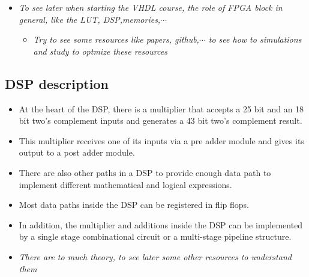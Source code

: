  

\begin{itemize}

\item \textit{To see later when starting the VHDL course, the role of FPGA block in general, like the LUT, DSP,memories,$\cdots$}

	\begin{itemize}
	\item \textit{Try to see some resources like papers, github,$\cdots$ to see how to simulations and study to optmize these resources}
	\end{itemize}

\end{itemize}

\subsection{DSP description}

\begin{itemize}

\item At the heart of the DSP, there is a multiplier that accepts a 25 bit and an 18 bit two's complement
inputs and generates a 43 bit two's complement result.

\item This multiplier receives one of its inputs via a pre adder module and gives its output to a post adder
module.

\item There are also other paths in a DSP to provide enough data path to implement different mathematical
and logical expressions.

\item Most data paths inside the DSP can be registered in flip flops.

\item In addition, the multiplier and additions inside the DSP can be implemented by a single stage combinational circuit or a multi-stage pipeline structure.

\end{itemize}

 

\begin{itemize}

\item \textit{There are to much theory, to see later some other resources to understand them}

\end{itemize}

